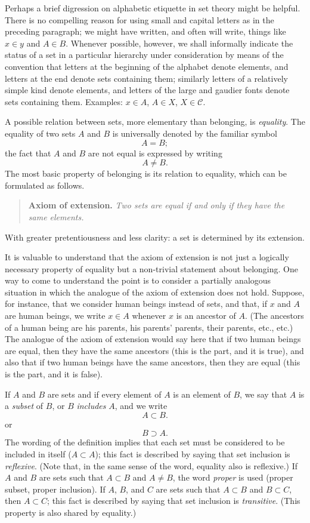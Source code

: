   Perhaps a brief digression on alphabetic etiquette in set theory might be helpful. 
 There is no compelling reason for using small and capital letters as in the preceding paragraph; we might have written, and often will write, things like $x \in y$ and $A \in B$. 
 Whenever possible, however, we shall informally indicate the status of a set in a particular hierarchy under consideration by means of the convention that letters at the beginning of the alphabet denote elements, and letters at the end denote sets containing them; similarly letters of a relatively simple kind denote elements, and letters of the large and gaudier fonts denote sets containing them. 
 Examples: $x \in A$, $A \in X$, $X \in \mathcal{C}$.


  A possible relation between sets, more elementary than belonging, is \textit{equality}. 
 The equality of two sets $A$ and $B$ is universally denoted by the familiar symbol  
\[A = B;\]    the fact that $A$ and $B$ are not equal is expressed by writing  
\[A \neq B.\]    
 The most basic property of belonging is its relation to equality, which can be formulated as follows.


  \begin{quote} 
 \textbf{Axiom of extension.} 
 \textit{Two sets are equal if and only if they have the same elements.} 
 \end{quote}


  With greater pretentiousness and less clarity: a set is determined by its extension.


  It is valuable to understand that the axiom of extension is not just a logically necessary property of equality but a non-trivial statement about belonging. 
 One way to come to understand the point is to consider a partially analogous situation in which the analogue of the axiom of extension does not hold. 
 Suppose, for instance, that we consider human beings instead of sets, and that, if $x$ and $A$ are human beings, we write $x \in A$ whenever $x$ is an ancestor of $A$. 
 (The ancestors of a human being are his parents, his parents' parents, their parents, etc., etc.) 
 The analogue of the axiom of extension would say here that if two human beings are equal, then they have the same ancestors (this is the  part, and it is true), and also that if two human beings have the same ancestors, then they are equal (this is the  part, and it is false).


  If $A$ and $B$ are sets and if every element of $A$ is an element of $B$, we say that $A$ is a \textit{subset} of $B$, or $B$ \textit{includes} $A$, and we write  
\[A \subset B.\]    or  
\[B \supset A.\]    
 The wording of the definition implies that each set must be considered to be included in itself ($A \subset A$); this fact is described by saying that set inclusion is \textit{reflexive}. (Note that, in the same sense of the word, equality also is reflexive.) 
 If $A$ and $B$ are sets such that $A \subset B$ and $A \neq B$, the word \textit{proper} is used (proper subset, proper inclusion). 
 If $A$, $B$, and $C$ are sets such that $A \subset B$ and $B \subset C$, then $A \subset C$; this fact is described by saying that set inclusion is \textit{transitive}. 
 (This property is also shared by equality.)


